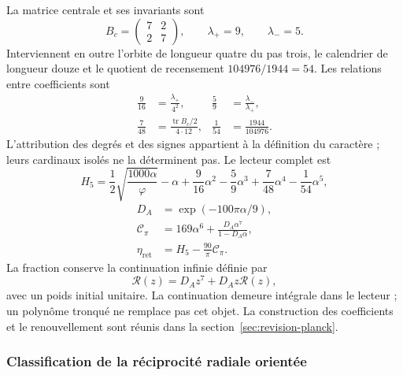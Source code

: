 La matrice centrale et ses invariants sont
\begin{equation}
 B_c=\begin{pmatrix}7&2\\2&7\end{pmatrix},\qquad
 \lambda_+=9,\qquad\lambda_-=5.
 \label{md:restop:matriz-central}
\end{equation}
Interviennent en outre l’orbite de longueur quatre du pas trois, le
calendrier de longueur douze et le quotient de recensement $104976/1944=54$.
Les relations entre coefficients sont
\begin{equation}
 \begin{aligned}
 \frac9{16}&=\frac{\lambda_+}{4^2},&
 \frac59&=\frac{\lambda_-}{\lambda_+},\\
 \frac7{48}&=\frac{\operatorname{tr}B_c/2}{4\cdot12},&
 \frac1{54}&=\frac{1944}{104976}.
 \end{aligned}
 \label{md:restop:coeficientes-h5}
\end{equation}
L’attribution des degrés et des signes appartient à la définition du caractère ;
leurs cardinaux isolés ne la déterminent pas. Le lecteur complet est
\begin{equation}
 H_5=\frac12\sqrt{\frac{1000\alpha}{\varphi}}-\alpha
 +\frac9{16}\alpha^2-\frac59\alpha^3
 +\frac7{48}\alpha^4-\frac1{54}\alpha^5,
 \label{md:restop:h5-completo}
\end{equation}
\begin{equation}
 \begin{aligned}
 D_A&=\exp(-100\pi\alpha/9),\\
 \mathcal C_\pi&=169\alpha^6+
 \frac{D_A\alpha^7}{1-D_A\alpha},\\
 \eta_{\mathrm{ret}}&=H_5-\frac{90}{\pi}\mathcal C_\pi.
 \end{aligned}
 \label{md:restop:retorno-regional}
\end{equation}
La fraction conserve la continuation infinie définie par
\begin{equation}
 \mathscr R(z)=D_Az^7+D_Az\mathscr R(z),
 \label{md:restop:renovacion}
\end{equation}
avec un poids initial unitaire. La continuation demeure intégrale dans le
lecteur ; un polynôme tronqué ne remplace pas cet objet. La construction
des coefficients et le renouvellement sont réunis dans la
section~\ref{sec:revision-planck}.

\subsubsection{Classification de la réciprocité radiale orientée}
\label{md:restop:geometria}

